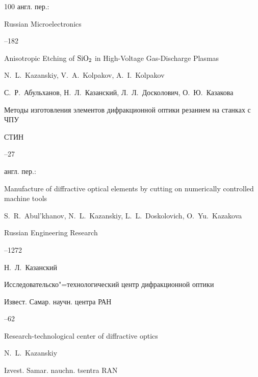 \begin{thebibliography}{100}
\transl англ. пер.:~

\jour Russian Microelectronics




--182

\paper  Anisotropic Etching of $\rm SiO_2$ in High-Voltage Gas-Discharge Plasmas

\by N.~L.~Kazanskiy, V.~A.~Kolpakov, A.~I.~Kolpakov 




\by С.~Р.~Абульханов, Н.~Л.~Казанский, Л.~Л.~Досколович, О.~Ю.~Казакова

\paper Методы изготовления элементов дифракционной оптики резанием на станках с ЧПУ

\jour СТИН



--27

\transl англ. пер.:~

\paper Manufacture of diffractive optical elements by cutting on numerically controlled machine tools

\by S.~R.~Abul'khanov, N.~L.~Kazanskiy, L.~L.~Doskolovich, O.~Yu.~Kazakova 

\jour Russian Engineering Research




--1272






\by Н.~Л.~Казанский

\paper Исследовательско"=технологический центр дифракционной оптики

\jour  Извест. Самар. научн. центра РАН




--62

\misctransl

\paper Research-technological center of diffractive optics

\by N.~L.~Kazanskiy

\jour Izvest. Samar. nauchn. tsentra RAN


\end{thebibliography}
